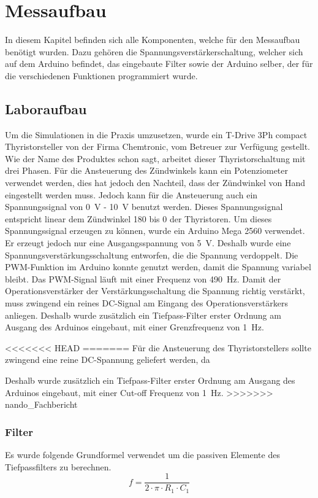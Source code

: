 \section{Messaufbau}
In diesem Kapitel befinden sich alle Komponenten, welche für den Messaufbau benötigt wurden. Dazu gehören die Spannungsverstärkerschaltung, welcher sich auf dem Arduino befindet, das eingebaute Filter sowie der Arduino selber, der für die verschiedenen Funktionen programmiert wurde.
\subsection{Laboraufbau}
Um die Simulationen in die Praxis umzusetzen, wurde ein \grqq T-Drive 3Ph compact Thyristorsteller\grqq \hspace{0.03cm} von der Firma Chemtronic, vom Betreuer zur Verfügung gestellt. Wie der Name des Produktes schon sagt, arbeitet dieser Thyristorschaltung mit drei Phasen. Für die Ansteuerung des Zündwinkels kann ein Potenziometer verwendet werden, dies hat jedoch den Nachteil, dass der Zündwinkel von Hand eingestellt werden muss. Jedoch kann für die Ansteuerung auch ein Spannungssignal von \SI{0}{V} - \SI{10}{V} benutzt werden. Dieses Spannungssignal entspricht linear dem Zündwinkel 180\textdegree \hspace{0.02cm} bis 0\textdegree \hspace{0.02cm} der Thyristoren. Um dieses Spannungssignal erzeugen zu können, wurde ein Arduino Mega 2560 verwendet. Er erzeugt jedoch nur eine Ausgangsspannung von \SI{5}{V}. Deshalb wurde eine Spannungsverstärkungsschaltung entworfen, die die Spannung verdoppelt. Die PWM-Funktion im Arduino konnte genutzt werden, damit die Spannung variabel bleibt. Das PWM-Signal läuft mit einer Frequenz von \SI{490}{Hz}. 
Damit der Operationsverstärker der Verstärkungsschaltung die Spannung richtig verstärkt, muss zwingend ein reines DC-Signal am Eingang des Operationsverstärkers anliegen. Deshalb wurde zusätzlich ein Tiefpass-Filter erster Ordnung am Ausgang des Arduinos eingebaut, mit einer Grenzfrequenz von \SI{1}{Hz}.  

<<<<<<< HEAD
=======
Für die Ansteuerung des Thyristorstellers sollte zwingend eine reine DC-Spannung geliefert werden, da

Deshalb wurde zusätzlich ein Tiefpass-Filter erster Ordnung am Ausgang des Arduinos eingebaut, mit einer Cut-off Frequenz von \SI{1}{Hz}.  
>>>>>>> nando_Fachbericht

\subsubsection{Filter}
Es wurde folgende Grundformel verwendet um die passiven Elemente des Tiefpassfilters zu berechnen.
\begin{equation}
f = \frac{1}{2 \cdot \pi \cdot R_1 \cdot C_1}
\end{equation}


